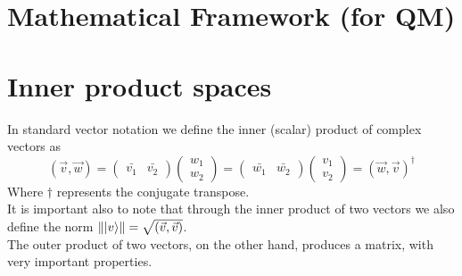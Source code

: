 
\section{Mathematical Framework (for QM)}
	
	
	
	\section{Inner product spaces}
	In standard vector notation we define the inner (scalar) product of complex vectors as
	$$ ( \vec{v}, \vec{w} ) =  \begin{pmatrix} \bar{v_1} & \bar{v_2}\end{pmatrix} \begin{pmatrix} w_1 \\ w_2 \end{pmatrix} = \begin{pmatrix} \bar{w_1} & \bar{w_2}\end{pmatrix} \begin{pmatrix} v_1 \\ v_2 \end{pmatrix} = ( \vec{w}, \vec{v} )^{\dagger}$$
	Where $\dagger$ represents the conjugate transpose.\\
	
	It is important also to note that through the inner product of two vectors we also define the norm $\||v \rangle\|  =  \sqrt{( \vec{v}, \vec{v} )} $.\\
	
	
	The outer product of two vectors, on the other hand, produces a matrix, with very important properties.  
	
